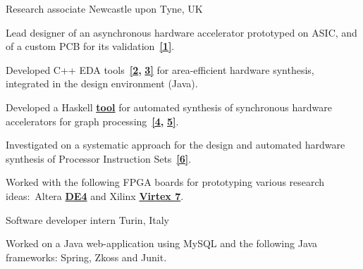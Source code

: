 \begin{cventries}
\cventry
{}
{\vspace{-9mm}Research associate } %
{\vspace{-9mm}Newcastle upon Tyne, UK} %
{}
{	
\begin{cvitems}
\item {Lead designer of an asynchronous hardware accelerator prototyped on 
ASIC, and of a custom PCB for its 
validation~{\color{myblue}\href{https://github.com/tuura/papers/tree/master/date-2018}{\textbf{[1]}}}.}
\item {Developed C++ EDA
tools~{\color{myblue}\href{https://github.com/tuura/shutters}{\textbf{[2}}}{\color{myblue}\textbf{,}}
{\color{myblue}\href{https://github.com/tuura/scenco}{\textbf{3]}}}
for area-efficient hardware synthesis, integrated in the
\href{https://workcraft.org/}{}
design environment (Java).}
\item {Developed a Haskell 
{\color{myblue}\href{https://github.com/tuura/fantasi/tree/master/doc}{\textbf{tool}}}
for automated synthesis of synchronous hardware accelerators for graph
processing~{\color{myblue}\href{https://youtu.be/Z2w0hiHY3Us}{\textbf{[4}}}{\color{myblue}\textbf{,}}
{\color{myblue}\href{https://poets-project.org/publications}{\textbf{5]}}}.}
\item {Investigated on a systematic approach for the design and automated 
hardware synthesis of Processor Instruction 
Sets~{\color{myblue}\href{https://eprint.ncl.ac.uk/file_store/production/251075/92600BF7-92A0-4B22-897A-01892DDA9E2F.pdf}{\textbf{[6]}}}.}
\item {Worked with the following FPGA boards for prototyping various research 
ideas:~Altera 	
{\color{myblue}\href{https://www.altera.com/solutions/partners/partner-profile/terasic-inc-/board/de4-stratix-iv-development-board.html\#overview}{\textbf{DE4}}}
and Xilinx 	
{\color{myblue}\href{https://www.xilinx.com/products/boards-and-kits/ek-v7-vc707-g.html}{\textbf{Virtex
 7}}}.}
\end{cvitems}
}
\vspace{-5mm}

\cventry
{}%
{\vspace{-9mm}Software developer intern }
{\vspace{-9mm}Turin, Italy}
{}
{
\begin{cvitems}
Worked on a Java web-application using MySQL and 
the following Java frameworks: Spring, Zkoss and Junit.
\end{cvitems}
}


\end{cventries}
\vspace{-2mm}